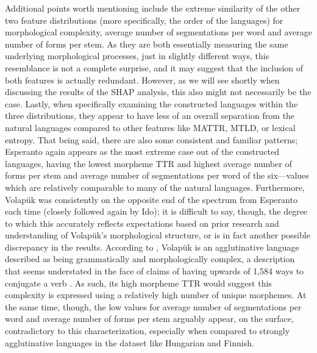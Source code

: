 \documentclass[12pt,a4paper]{article}
\numberwithin{figure}{section}
\numberwithin{table}{section}
\numberwithin{definition}{section}
\begin{document}
Additional points worth mentioning include the extreme similarity of the other two feature distributions (more specifically, the order of the languages) for morphological complexity, average number of segmentations per word and average number of forms per stem. As they are both essentially measuring the same underlying morphological processes, just in slightly different ways, this resemblance is not a complete surprise, and it may suggest that the inclusion of both features is actually redundant. However, as we will see shortly when discussing the results of the SHAP analysis, this also might not necessarily be the case. Lastly, when specifically examining the constructed languages within the three distributions, they appear to have less of an overall separation from the natural languages compared to other features like MATTR, MTLD, or lexical entropy. That being said, there are also some consistent and familiar patterns; Esperanto again appears as the most extreme case out of the constructed languages, having the lowest morpheme TTR and highest average number of forms per stem and average number of segmentations per word of the six---values which are relatively comparable to many of the natural languages. Furthermore, Volapük was consistently on the opposite end of the spectrum from Esperanto each time (closely followed again by Ido); it is difficult to say, though, the degree to which this accurately reflects expectations based on prior research and understanding of Volapük's morphological structure, or is in fact another possible discrepancy in the results. According to \textcite{Reagan2019book}, Volapük is an agglutinative language described as being grammatically and morphologically complex, a description that seems understated in the face of claims of having upwards of 1,584 ways to conjugate a verb \parencite{Reagan2019book,Rogers2011book}. As such, its high morpheme TTR would suggest this complexity is expressed using a relatively high number of unique morphemes. At the same time, though, the low values for average number of segmentations per word and average number of forms per stem arguably appear, on the surface, contradictory to this characterization, especially when compared to strongly agglutinative languages in the dataset like Hungarian and Finnish. %

\end{document}
